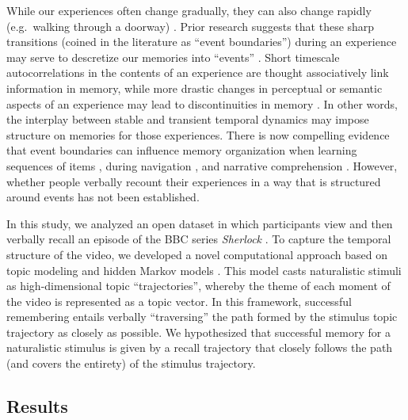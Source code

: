 \documentclass{article}
\begin{document}
While our experiences often change gradually, they can also change rapidly (e.g.\ walking through a doorway) \citep{RadvZack17}. Prior research suggests that these sharp transitions (coined in the literature as ``event boundaries'') during an experience may serve to descretize our memories into ``events'' \citep{RadvZack17, BrunEtal18, HeusEtal18, ClewDava17, EzzyDava11, DuBrDava13}. Short timescale autocorrelations in the contents of an experience are thought associatively link information in memory, while more drastic changes in perceptual or semantic aspects of an experience may lead to discontinuities in memory \citep{HeusEtal18, BrunEtal18, EzzyDava11, DuBrDava13}.  In other words, the interplay between stable and transient temporal dynamics may impose structure on memories for those experiences. There is now compelling evidence that event boundaries can influence memory organization when learning sequences of items \citep{HeusEtal18, DuBrDava13}, during navigation \citep{BrunEtal18}, and narrative comprehension \citep{ZwaaRadv98, EzzyDava11}.  However, whether people verbally recount their experiences in a way that is structured around events has not been established.

In this study, we analyzed an open dataset in which participants view and then verbally recall an episode of the BBC series \textit{Sherlock} \citep{ChenEtal17}. To capture the temporal structure of the video, we developed a novel computational approach based on topic modeling \citep{BleiEtal03} and hidden Markov models \citep{Rabi89, BaldEtal17}. This model casts naturalistic stimuli as high-dimensional topic ``trajectories'', whereby the theme of each moment of the video is represented as a topic vector. In this framework, successful remembering entails verbally ``traversing'' the path formed by the stimulus topic trajectory as closely as possible. We hypothesized that successful memory for a naturalistic stimulus is given by a recall trajectory that closely follows the path (and covers the entirety) of the stimulus trajectory.

\subsection{Results}
\end{document}
